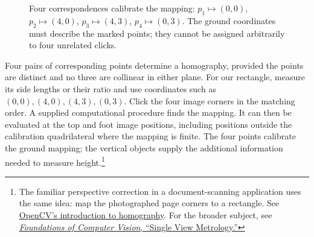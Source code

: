 \begin{figure}[htbp]\centering
{}
\caption{Four correspondences calibrate the mapping:
$p_1\mapsto(0,0)$, $p_2\mapsto(4,0)$, $p_3\mapsto(4,3)$,
$p_4\mapsto(0,3)$. The ground coordinates must describe the marked
points; they cannot be assigned arbitrarily to four unrelated clicks.}
\label{fig:geo-homography}
\end{figure}

Four pairs of corresponding points determine a homography, provided the
points are distinct and no three are collinear in either plane. For our
rectangle, measure its side lengths or their ratio and use coordinates
such as $(0,0),(4,0),(4,3),(0,3)$. Click the four image corners in the
matching order. A supplied computational procedure finds the mapping.
It can then be evaluated at the top and foot image positions, including
positions outside the calibration quadrilateral where the mapping is finite.
The four points calibrate the ground mapping; the vertical objects supply
the additional information needed to measure height.\footnote{The familiar
perspective correction in a document-scanning application uses the same
idea: map the photographed page corners to a rectangle. See
\href{https://docs.opencv.org/4.0.0-alpha/d9/dab/tutorial_homography.html}{OpenCV's introduction to homography}.
For the broader subject, see
\href{https://visionbook.mit.edu/3d_scene_understanding_single_view.html}{\emph{Foundations of Computer Vision}, ``Single View Metrology.''}}

